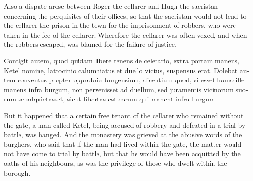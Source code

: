 \documentclass[10pt]{book}
\begin{document}
\begin{paracol}{2}
\begin{otherlanguage}{latin}
\end{otherlanguage}

\switchcolumn

Also a dispute arose between Roger the cellarer and Hugh the sacristan concerning the perquisites of their offices, so that the sacristan would not lend to the cellarer the prison in the town for the imprisonment of robbers, who were taken in the fee of the cellarer. Wherefore the cellarer was often vexed, and when the robbers escaped, was blamed for the failure of justice.

\switchcolumn*

\begin{otherlanguage}{latin}
Contigit autem, quod quidam libere tenens de celerario, extra portam manens, Ketel nomine, latrocinio calumniatus et duello victus, suspensus erat. Dolebat autem conventus propter opprobria burgensium, dicentium quod, si esset homo ille manens infra burgum, non pervenisset ad duellum, sed juramentis vicinorum suorum se adquietasset, sicut libertas est eorum qui manent infra burgum.
\end{otherlanguage}

\switchcolumn

But it happened that a certain free tenant of the cellarer who remained without the gate, a man called Ketel, being accused of robbery and defeated in a trial by battle, was hanged. And the monastery was grieved at the abusive words of the burghers, who said that if the man had lived within the gate, the matter would not have come to trial by battle, but that he would have been acquitted by the oaths of his neighbours, as was the privilege of those who dwelt within the borough.

\switchcolumn*


\end{paracol}
\end{document}
